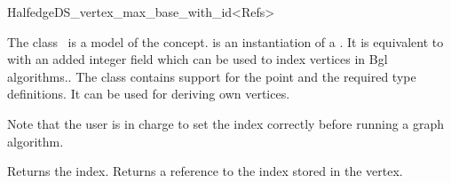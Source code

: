 


\begin{ccRefClass}{HalfedgeDS_vertex_max_base_with_id<Refs>}

\ccDefinition
  
The class \ccRefName\ is a model of the 
concept.  is an instantiation of a .  It is
equivalent to 
with an added integer field which can be used to index vertices
in {\sc Bgl} algorithms.. 
The class contains support for the point and the required type definitions.
It can be used for deriving own vertices.

Note that the user is in charge to set the index correctly before
running a graph algorithm.


\ccIsModel


\ccThreeToTwo

\ccCreation
{}


{Returns the index.}
\ccGlue
{}
{Returns a reference to the index stored in the vertex.}

\ccSeeAlso

\\
\\
\\
\\
\\
\\

\end{ccRefClass}


